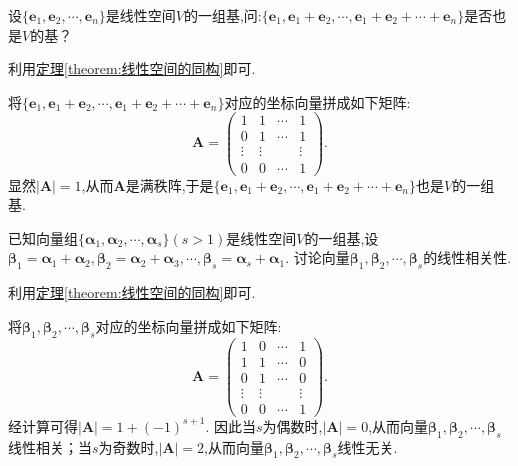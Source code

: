 \documentclass[../../main.tex]{subfiles}
\begin{document}
\begin{example}
设\(\{\boldsymbol{e}_1,\boldsymbol{e}_2,\cdots,\boldsymbol{e}_n\}\)是线性空间\(V\)的一组基,问:\(\{\boldsymbol{e}_1,\boldsymbol{e}_1+\boldsymbol{e}_2,\cdots,\boldsymbol{e}_1+\boldsymbol{e}_2+\cdots+\boldsymbol{e}_n\}\)是否也是\(V\)的基？
\end{example}
\begin{note}
利用\hyperref[theorem:线性空间的同构]{定理\ref{theorem:线性空间的同构}}即可.
\end{note}
\begin{solution}
将\(\{\boldsymbol{e}_1,\boldsymbol{e}_1+\boldsymbol{e}_2,\cdots,\boldsymbol{e}_1+\boldsymbol{e}_2+\cdots+\boldsymbol{e}_n\}\)对应的坐标向量拼成如下矩阵:
\[
\boldsymbol{A}=\begin{pmatrix}
1&1&\cdots&1\\
0&1&\cdots&1\\
\vdots&\vdots&&\vdots\\
0&0&\cdots&1
\end{pmatrix}.
\]
显然\(|\boldsymbol{A}| = 1\),从而\(\boldsymbol{A}\)是满秩阵,于是\(\{\boldsymbol{e}_1,\boldsymbol{e}_1+\boldsymbol{e}_2,\cdots,\boldsymbol{e}_1+\boldsymbol{e}_2+\cdots+\boldsymbol{e}_n\}\)也是\(V\)的一组基. 
\end{solution}

\begin{example}
已知向量组\(\{\boldsymbol{\alpha}_1,\boldsymbol{\alpha}_2,\cdots,\boldsymbol{\alpha}_s\}(s > 1)\)是线性空间\(V\)的一组基,设\(\boldsymbol{\beta}_1=\boldsymbol{\alpha}_1+\boldsymbol{\alpha}_2,\boldsymbol{\beta}_2=\boldsymbol{\alpha}_2+\boldsymbol{\alpha}_3,\cdots,\boldsymbol{\beta}_s=\boldsymbol{\alpha}_s+\boldsymbol{\alpha}_1\). 讨论向量\(\boldsymbol{\beta}_1,\boldsymbol{\beta}_2,\cdots,\boldsymbol{\beta}_s\)的线性相关性.
\end{example}
\begin{note}
利用\hyperref[theorem:线性空间的同构]{定理\ref{theorem:线性空间的同构}}即可.
\end{note}
\begin{solution}
将\(\boldsymbol{\beta}_1,\boldsymbol{\beta}_2,\cdots,\boldsymbol{\beta}_s\)对应的坐标向量拼成如下矩阵:
\[
\boldsymbol{A}=\begin{pmatrix}
1&0&\cdots&1\\
1&1&\cdots&0\\
0&1&\cdots&0\\
\vdots&\vdots&&\vdots\\
0&0&\cdots&1
\end{pmatrix}.
\]
经计算可得\(|\boldsymbol{A}| = 1+(-1)^{s + 1}\). 因此当\(s\)为偶数时,\(|\boldsymbol{A}| = 0\),从而向量\(\boldsymbol{\beta}_1,\boldsymbol{\beta}_2,\cdots,\boldsymbol{\beta}_s\)线性相关；当\(s\)为奇数时,\(|\boldsymbol{A}| = 2\),从而向量\(\boldsymbol{\beta}_1,\boldsymbol{\beta}_2,\cdots,\boldsymbol{\beta}_s\)线性无关. 
\end{solution}
\end{document}
